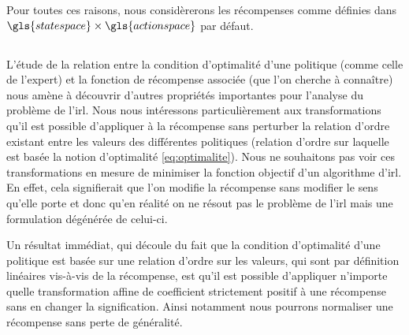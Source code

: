 \documentclass[frenchb,a4paper,justified,notoc]{tufte-book}
\newcommand{\statespace}{\gls{statespace}}
\newcommand{\actionspace}{\gls{actionspace}}
\begin{document}
Pour toutes ces raisons, nous considèrerons les récompenses comme définies dans $\statespace\times\actionspace$ par défaut.
\subsection{}
\label{sec-3-1-2}


L'étude de la relation entre la condition d'optimalité d'une politique (comme celle de l'expert) et la fonction de récompense associée (que l'on cherche à connaître) nous amène à découvrir d'autres propriétés importantes pour l'analyse du problème de l'\gls{irl}. Nous nous intéressons particulièrement aux transformations qu'il est possible d'appliquer à la récompense sans perturber la relation d'ordre existant entre les valeurs des différentes politiques (relation d'ordre sur laquelle est basée la notion d'optimalité \autoref{eq:optimalite}). Nous ne souhaitons pas voir ces transformations en mesure de minimiser la fonction objectif d'un algorithme d'\gls{irl}. En effet, cela signifierait que l'on modifie la récompense sans modifier le sens qu'elle porte et donc qu'en réalité on ne résout pas le problème de l'\gls{irl} mais une formulation dégénérée de celui-ci.

Un résultat immédiat, qui découle du fait que la condition d'optimalité d'une politique est basée sur une relation d'ordre sur les valeurs, qui sont par définition linéaires vis-à-vis de la récompense, est qu'il est possible d'appliquer n'importe quelle transformation affine de coefficient strictement positif à une récompense sans en changer la signification. Ainsi notamment nous pourrons normaliser une récompense sans perte de généralité.
\end{document}
